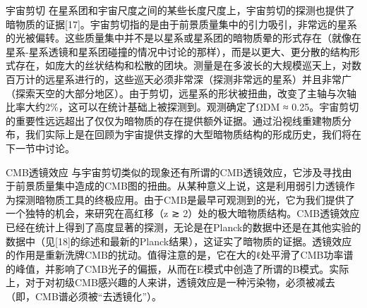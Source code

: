 宇宙剪切
在星系团和宇宙尺度之间的某些长度尺度上，宇宙剪切的探测也提供了暗物质的证据[17]。宇宙剪切指的是由于前景质量集中的引力吸引，非常远的星系的光被偏转。这些质量集中并不是以星系或星系团的暗物质晕的形式存在（就像在星系-星系透镜和星系团碰撞的情况中讨论的那样），而是以更大、更分散的结构形式存在，如庞大的丝状结构和松散的团块。测量是在多波长的大规模巡天上，对数百万计的远星系进行的，这些巡天必须非常深（探测非常远的星系）并且非常广（探索天空的大部分地区）。由于剪切，远星系的形状被扭曲，改变了主轴与次轴比率大约2\%，这可以在统计基础上被探测到。观测确定了ΩDM ≈ 0.25。宇宙剪切的重要性远远超出了仅仅为暗物质的存在提供额外证据。通过沿视线重建物质分布，我们实际上是在回顾为宇宙提供支撑的大型暗物质结构的形成历史，我们将在下一节中讨论。

CMB透镜效应
与宇宙剪切类似的现象还有所谓的CMB透镜效应，它涉及寻找由于前景质量集中造成的CMB图的扭曲。从某种意义上说，这是利用弱引力透镜作为探测暗物质工具的终极应用。由于CMB是最早可观测到的光，它为我们提供了一个独特的机会，来研究在高红移（z ≳ 2）处的极大暗物质结构。CMB透镜效应已经在统计上得到了高度显著的探测，无论是在Planck的数据中还是在其他实验的数据中（见[18]的综述和最新的Planck结果），这证实了暗物质的证据。透镜效应的作用是重新洗牌CMB的扰动。值得注意的是，它在大的ℓ处平滑了CMB功率谱的峰值，并影响了CMB光子的偏振，从而在E模式中创造了所谓的B模式。实际上，对于对初级CMB感兴趣的人来讲，透镜效应是一种污染物，必须被减去（即，CMB谱必须被“去透镜化”）。


